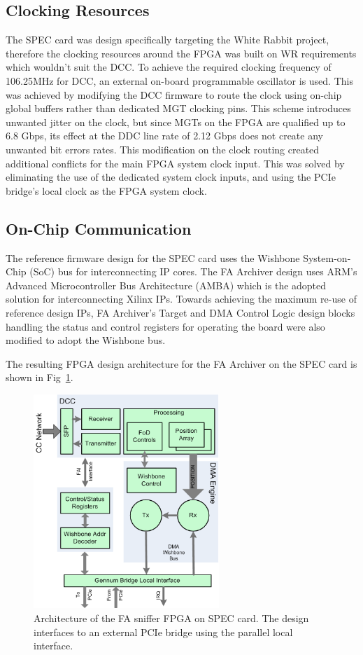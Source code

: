\documentclass[a4paper,
              ]{jacow}
\begin{document}
\subsection{Clocking Resources}
The SPEC card was design specifically targeting the White Rabbit project, therefore the clocking resources around the FPGA was built on WR requirements which wouldn't suit the DCC. To achieve the required clocking frequency of 106.25MHz for DCC, an external on-board programmable oscillator is used. This was achieved by modifying the DCC firmware to route the clock using on-chip global buffers rather than dedicated MGT clocking pins. This scheme introduces unwanted jitter on the clock, but since MGTs on the FPGA are qualified up to 6.8 Gbps, its effect at the DDC line rate of 2.12 Gbps does not create any unwanted bit errors rates. This modification on the clock routing created additional conflicts for the main FPGA system clock input. This was solved by eliminating the use of the dedicated system clock inputs, and using the PCIe bridge's local clock as the FPGA system clock.

\subsection{On-Chip Communication}
The reference firmware design for the SPEC card uses the Wishbone System-on-Chip (SoC) bus for interconnecting IP cores. The FA Archiver design uses ARM's Advanced Microcontroller Bus Architecture (AMBA) which is the adopted solution for interconnecting Xilinx IPs. Towards achieving the maximum re-use of reference design IPs, FA Archiver's Target and DMA Control Logic design blocks handling the status and control registers for operating the board were also modified to adopt the Wishbone bus.

The resulting FPGA design architecture for the FA Archiver on the SPEC card is shown in 
Fig~\ref{SPECS}.

\begin{figure}[t!]
   \centering
   \includegraphics[width=70mm]{img/WEPGF089f6}
   \caption{Architecture of the FA sniffer FPGA on SPEC card. The design interfaces to an external PCIe bridge using the parallel local interface.}
   \label{SPECS}
\end{figure}
\end{document}
